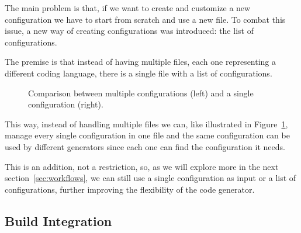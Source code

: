 The main problem is that, if we want to create and customize a new configuration we have to start from scratch and use a new file. To combat this issue, a new way of creating configurations was introduced: the list of configurations.

The premise is that instead of having multiple files, each one representing a different coding language, there is a single file with a list of configurations.

\begin{figure}[h]
	\centering
{}
\hspace{1cm}
\caption{Comparison between multiple configurations (left) and a single configuration (right).}
\label{fig:tree_config_comparison}
\end{figure}


This way, instead of handling multiple files we can, like illustrated in Figure~\ref{fig:tree_config_comparison}, manage every single configuration in one file and the same configuration can be used by different generators since each one can find the configuration it needs.

This is an addition, not a restriction, so, as we will explore more in the next section~\ref{sec:workflows}, we can still use a single configuration as input or a list of configurations, further improving the flexibility of the code generator.


\subsection{Build Integration}
\label{sec:impl_build_options}

